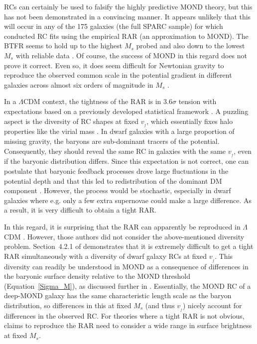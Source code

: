 \documentclass[fleqn,usenatbib,useAMS]{mnras} %
\begin{document}
RCs can certainly be used to falsify the highly predictive MOND theory, but this has not been demonstrated in a convincing manner. It appears unlikely that this will occur in any of the 175 galaxies (the full SPARC sample) for which \citet{Li_2018} conducted RC fits using the empirical RAR (an approximation to MOND). The BTFR seems to hold up to the highest $M_s$ probed and also down to the lowest $M_s$ with reliable data \citep{Saburova_2021}. Of course, the success of MOND in this regard does not prove it correct. Even so, it does seem difficult for Newtonian gravity to reproduce the observed common scale in the potential gradient in different galaxies across almost six orders of magnitude in $M_s$ \citep{Wu_2015}.

In a $\Lambda$CDM context, the tightness of the RAR is in $3.6\sigma$ tension with expectations \citep{Desmond_2017b} based on a previously developed statistical framework \citep{Desmond_2017a}. A puzzling aspect is the diversity of RC shapes at fixed $v_{_f}$, which essentially fixes halo properties like the virial mass \citep{Oman_2015}. In dwarf galaxies with a large proportion of missing gravity, the baryons are sub-dominant tracers of the potential. Consequently, they should reveal the same RC in galaxies with the same $v_{_f}$, even if the baryonic distribution differs. Since this expectation is not correct, one can postulate that baryonic feedback processes drove large fluctuations in the potential depth and that this led to redistribution of the dominant DM component \citep{Pontzen_2012}. However, the process would be stochastic, especially in dwarf galaxies where e.g. only a few extra supernovae could make a large difference. As a result, it is very difficult to obtain a tight RAR.

In this regard, it is surprising that the RAR can apparently be reproduced in $\Lambda$CDM \citep{Dutton_2019}. However, those authors did not consider the above-mentioned diversity problem. Section~4.2.1 of \citet{Ghari_2019_DM} demonstrates that it is extremely difficult to get a tight RAR simultaneously with a diversity of dwarf galaxy RCs at fixed $v_{_f}$. This diversity can readily be understood in MOND as a consequence of differences in the baryonic surface density relative to the MOND threshold (Equation~\ref{Sigma_M}), as discussed further in \citet{McGaugh_2020}. Essentially, the MOND RC of a deep-MOND galaxy has the same characteristic length scale as the baryon distribution, so differences in this at fixed $M_s$ (and thus $v_{_f}$) nicely account for differences in the observed RC. For theories where a tight RAR is not obvious, claims to reproduce the RAR need to consider a wide range in surface brightness at fixed $M_s$.
\end{document}
